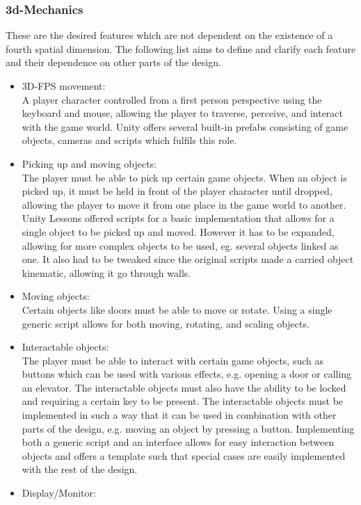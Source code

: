 \subsubsection{3d-Mechanics}
These are the desired features which are not dependent on the existence of a fourth spatial dimension. The following list aims to define and clarify each feature and their dependence on other parts of the design.
\begin{itemize}
	\item 3D-FPS movement:\\
	A player character controlled from a first person perspective using the keyboard and mouse, allowing the player to traverse, perceive, and interact with the game world. Unity offers several built-in prefabs consisting of game objects, cameras and scripts which fulfils this role.
	\item Picking up and moving objects:\\
	The player must be able to pick up certain game objects. When an object is picked up, it must be held in front of the player character until dropped, allowing the player to move it from one place in the game world to another. Unity Lessons\cite{unityLessons} offered scripts for a basic implementation that allows for a single object to be picked up and moved. However it has to be expanded, allowing for more complex objects to be used, eg. several objects linked as one. It also had to be tweaked since the original scripts made a carried object kinematic, allowing it go through walls.  
	\item Moving objects:\\
	Certain objects like doors must be able to move or rotate. Using a single generic script allows for both moving, rotating, and scaling objects. 
	\item Interactable objects:\\
	The player must be able to interact with certain game objects, such as buttons which can be used with various effects, e.g. opening a door or calling an elevator. The interactable objects must also have the ability to be locked and requiring a certain key to be present. The interactable objects must be implemented in such a way that it can be used in combination with other parts of the design, e.g. moving an object by pressing a button. Implementing both a generic script and an interface allows for easy interaction between objects and offers a template such that special cases are easily implemented with the rest of the design.
	\item Display/Monitor:\\

\end{itemize}
